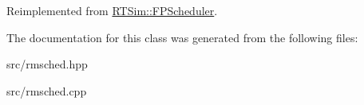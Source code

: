 Reimplemented from \hyperlink{classRTSim_1_1FPScheduler_abd92339de6b7580663a2da01f2eff683}{R\+T\+Sim\+::\+F\+P\+Scheduler}.



The documentation for this class was generated from the following files\+:\begin{DoxyCompactItemize}
\item 
src/rmsched.\+hpp\item 
src/rmsched.\+cpp\end{DoxyCompactItemize}
